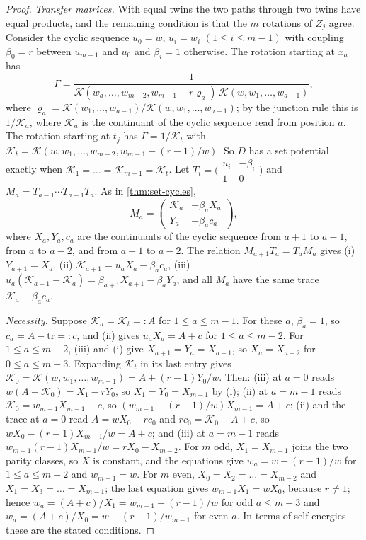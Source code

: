 \documentclass[final]{siamart0516}
\numberwithin{theorem}{section}
\numberwithin{equation}{section}
\theoremstyle{siamnonum}
\theoremstyle{plain}
\newcommand{\cont}{\mathcal{K}}           %
\begin{document}
\begin{proof}
\emph{Transfer matrices.} With equal twins the two paths through two twins have equal products, and the remaining condition is that the $m$ rotations of $Z_j$ agree. Consider the cyclic sequence $u_0=w$, $u_i=w_i$ $(1\le i\le m-1)$ with coupling $\beta_0=r$ between $u_{m-1}$ and $u_0$ and $\beta_i=1$ otherwise. The rotation starting at $x_a$ has
\[
\Gamma=\frac{1}{\cont(w_a,\dots,w_{m-2},w_{m-1}-r\varrho_a)\,\cont(w,w_1,\dots,w_{a-1})},
\]
where $\varrho_a=\cont(w_1,\dots,w_{a-1})/\cont(w,w_1,\dots,w_{a-1})$; by the junction rule this is $1/\cont_a$, where $\cont_a$ is the continuant of the cyclic sequence read from position $a$. The rotation starting at $t_j$ has $\Gamma=1/\cont_t$ with $\cont_t=\cont(w,w_1,\dots,w_{m-2},w_{m-1}-(r-1)/w)$. So $D$ has a set potential exactly when $\cont_1=\dots=\cont_{m-1}=\cont_t$. Let $T_i=\bigl(\begin{smallmatrix}u_i&-\beta_i\\1&0\end{smallmatrix}\bigr)$ and $M_a=T_{a-1}\cdots T_{a+1}T_a$. As in \cref{thm:set-cycles},
\[
M_a=\begin{pmatrix}\cont_a&-\beta_aX_a\\Y_a&-\beta_ac_a\end{pmatrix},
\]
where $X_a,Y_a,c_a$ are the continuants of the cyclic sequence from $a+1$ to $a-1$, from $a$ to $a-2$, and from $a+1$ to $a-2$. The relation $M_{a+1}T_a=T_aM_a$ gives (i) $Y_{a+1}=X_a$, (ii) $\cont_{a+1}=u_aX_a-\beta_ac_a$, (iii) $u_a(\cont_{a+1}-\cont_a)=\beta_{a+1}X_{a+1}-\beta_aY_a$, and all $M_a$ have the same trace $\cont_a-\beta_ac_a$.

\emph{Necessity.} Suppose $\cont_a=\cont_t=:A$ for $1\le a\le m-1$. For these $a$, $\beta_a=1$, so $c_a=A-\mathrm{tr}=:c$, and (ii) gives $u_aX_a=A+c$ for $1\le a\le m-2$. For $1\le a\le m-2$, (iii) and (i) give $X_{a+1}=Y_a=X_{a-1}$, so $X_a=X_{a+2}$ for $0\le a\le m-3$. Expanding $\cont_t$ in its last entry gives $\cont_0=\cont(w,w_1,\dots,w_{m-1})=A+(r-1)Y_0/w$. Then: (iii) at $a=0$ reads $w(A-\cont_0)=X_1-rY_0$, so $X_1=Y_0=X_{m-1}$ by (i); (ii) at $a=m-1$ reads $\cont_0=w_{m-1}X_{m-1}-c$, so $(w_{m-1}-(r-1)/w)X_{m-1}=A+c$; (ii) and the trace at $a=0$ read $A=wX_0-rc_0$ and $rc_0=\cont_0-A+c$, so $wX_0-(r-1)X_{m-1}/w=A+c$; and (iii) at $a=m-1$ reads $w_{m-1}(r-1)X_{m-1}/w=rX_0-X_{m-2}$. For $m$ odd, $X_1=X_{m-1}$ joins the two parity classes, so $X$ is constant, and the equations give $w_a=w-(r-1)/w$ for $1\le a\le m-2$ and $w_{m-1}=w$. For $m$ even, $X_0=X_2=\dots=X_{m-2}$ and $X_1=X_3=\dots=X_{m-1}$; the last equation gives $w_{m-1}X_1=wX_0$, because $r\neq1$; hence $w_a=(A+c)/X_1=w_{m-1}-(r-1)/w$ for odd $a\le m-3$ and $w_a=(A+c)/X_0=w-(r-1)/w_{m-1}$ for even $a$. In terms of self-energies these are the stated conditions.


\end{proof}
\end{document}
